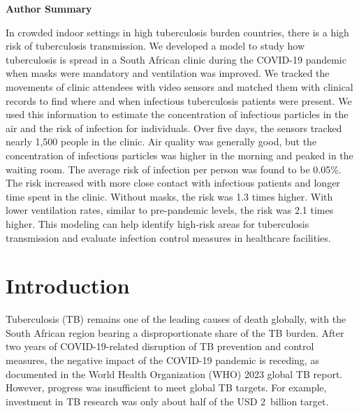 \documentclass[fleqn,11pt]{wlscirep}
\begin{document}
\flushbottom
\maketitle
\setcounter{page}{1}
\thispagestyle{fancy}

\newpage

\sloppy
\raggedbottom

\newpage

\noindent\large{\textbf{Author Summary}}

\noindent In crowded indoor settings in high tuberculosis burden countries, there is a high risk of tuberculosis transmission. We developed a model to study how tuberculosis is spread in a South African clinic during the COVID-19 pandemic when masks were mandatory and ventilation was improved. We tracked the movements of clinic attendees with video sensors and matched them with clinical records to find where and when infectious tuberculosis patients were present. We used this information to estimate the concentration of infectious particles in the air and the risk of infection for individuals. Over five days, the sensors tracked nearly 1,500 people in the clinic. Air quality was generally good, but the concentration of infectious particles was higher in the morning and peaked in the waiting room. The average risk of infection per person was found to be 0.05\%. The risk increased with more close contact with infectious patients and longer time spent in the clinic. Without masks, the risk was 1.3 times higher. With lower ventilation rates, similar to pre-pandemic levels, the risk was 2.1 times higher. This modeling can help identify high-risk areas for tuberculosis transmission and evaluate infection control measures in healthcare facilities.

\newpage

\section*{Introduction} 

Tuberculosis (TB) remains one of the leading causes of death globally, with the South African region bearing a disproportionate share of the TB burden.  After two years of COVID-19-related disruption of TB prevention and control measures, the negative impact of the COVID-19 pandemic is receding, as documented in the World Health Organization (WHO) 2023 global TB report\cite{WHO2023TBReport}. However, progress was insufficient to meet global TB targets\cite{WHO2023TBReport}. For example, investment in TB research was only about half of the USD 2~billion target\cite{WHO2023TBReport}.
\end{document}
